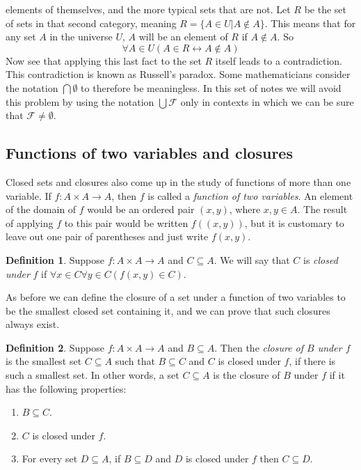 \documentclass{report}
\theoremstyle{definition}
\newtheorem*{definition}{Definition}
\begin{document}
elements of themselves, and the more typical sets that are not. Let $R$ be the set of sets in 
that second category, meaning $R=\{A\in U|A\notin A\}$. This means that for any set $A$ in the universe $U$, $A$ will be an element of $R$ if $A\notin A$. So
\begin{equation*}
\forall A\in U(A\in R\leftrightarrow A\notin A)
\end{equation*}
Now see that applying this last fact to the set $R$ itself leads to a contradiction. This contradiction is known as Russell's paradox. Some mathematicians consider the notation $\bigcap\emptyset$ 
to therefore be meaningless. In this set of notes we will avoid this problem by using the notation
$\bigcup\mathcal F$ only in contexts in which we can be sure that $\mathcal F\neq\emptyset$.
\newpage

\subsection{Functions of two variables and closures}
Closed sets and closures also come up in the study of functions of more than one variable. If $f:A\times A\to A$, then $f$ is called a \textit{function of two variables}. An element of the domain
of $f$ would be an ordered pair $(x,y)$, where $x,y\in A$. The result of applying $f$ to this pair would be written $f((x,y))$, but it is customary to leave out one pair of parentheses and 
just write $f(x,y)$.
\begin{definition}
Suppose $f:A\times A\to A$ and $C\subseteq A$. We will say that $C$ is \textit{closed under} $f$ if $\forall x\in C\forall y\in C(f(x,y)\in C)$.
\end{definition}
\noindent As before we can define the closure of a set under a function of two variables to be the smallest closed set containing it, and we can prove that such closures always exist.
\begin{definition}
Suppose $f:A\times A\to A$ and $B\subseteq A$. Then the \textit{closure of $B$ under $f$} is the smallest set $C\subseteq A$ such that $B\subseteq C$ and $C$ is closed under $f$, if there is such 
a smallest set. In other words, a set $C\subseteq A$ is the closure of $B$ under $f$ if it has the following properties:
\begin{enumerate}
\item $B\subseteq C$.
\item $C$ is closed under $f$.
\item For every set $D\subseteq A$, if $B\subseteq D$ and $D$ is closed under $f$ then $C\subseteq D$.
\end{enumerate}
\end{definition}
\end{document}
